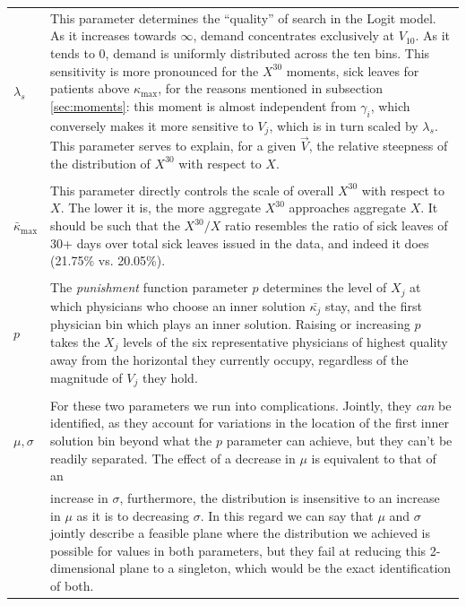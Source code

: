\documentclass[../main.tex]{subfiles}
\begin{document}
\vspace{0.5em}
\begin{xltabular}{\textwidth}{lX}
  
  
    $\lambda_s$ & This parameter determines the ``quality'' of search in the Logit model. As it increases towards $\infty$, demand concentrates exclusively at $V_{10}$. As it tends to 0, demand is uniformly distributed across the ten bins. This sensitivity is more pronounced for the $X^{30}$ moments, sick leaves for patients above $\kappa_{\max}$, for the reasons mentioned in subsection \ref{sec:moments}: this moment is almost independent from $\gamma_i$, which conversely makes it more sensitive to $V_j$, which is in turn scaled by  $\lambda_s$. This parameter serves to explain, for a given $\vec{V}$, the relative steepness of the distribution of $X^{30}$ with respect to $X$. \\
    \\
    $\bar{\kappa}_{\max}$ & This parameter directly controls the scale of overall $X^{30}$ with respect to $X$. The lower it is, the more aggregate $X^{30}$ approaches aggregate $X$. It should be such that the $X^{30}/X$ ratio resembles the ratio of sick leaves of 30+ days over total sick leaves issued in the data, and indeed it does (21.75\% vs. 20.05\%). \\
    \\
    $p$ & The \textit{punishment} function parameter $p$ determines the level of $X_j$ at which physicians who choose an inner solution $\bar{\kappa_j}$ stay, and the first physician bin which plays an inner solution. Raising or increasing $p$ takes the $X_j$ levels of the six representative physicians of highest quality away from the horizontal they currently occupy, regardless of the magnitude of $V_j$ they hold. \\
    \\
    $\mu, \sigma$ & For these two parameters we run into complications. Jointly, they \textit{can} be identified, as they account for variations in the location of the first inner solution bin beyond what the $p$ parameter can achieve, but they can't be readily separated. The effect of a decrease in $\mu$ is equivalent to that of an \\
    & increase in $\sigma$, furthermore, the distribution is insensitive to an increase in $\mu$ as it is to decreasing $\sigma$. In this regard we can say that $\mu$ and $\sigma$ jointly describe a feasible plane where the distribution we achieved is possible for values in both parameters, but they fail at reducing this 2-dimensional plane to a singleton, which would be the exact identification of both.
\end{xltabular}
\end{document}
